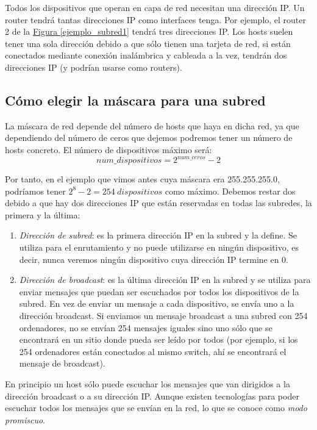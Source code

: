 \documentclass[10pt,a4paper,spanish]{report}
\begin{document}
Todos los dispositivos que operan en capa de red necesitan una dirección IP. Un router tendrá tantas direcciones IP como interfaces tenga. Por ejemplo, el router 2 de la \hyperref[ejemplo_subred1]{Figura \ref*{ejemplo_subred1}} tendrá tres direcciones IP. Los hosts suelen tener una sola dirección debido a que sólo tienen una tarjeta de red, si están conectados mediante conexión inalámbrica y cableada a la vez, tendrán dos direcciones IP (y podrían usarse como routers).

\subsection{\textcolor{tema4}Cómo elegir la máscara para una subred}
La máscara de red depende del número de hosts que haya en dicha red, ya que dependiendo del número de ceros que dejemos podremos tener un número de hosts concreto. El número de dispositivos máximo será:
\begin{displaymath}
  num\_dispositivos = 2^{num\_ceros} - 2
\end{displaymath}

Por tanto, en el ejemplo que vimos antes cuya máscara era 255.255.255.0, podríamos tener $2^8 - 2 = 254 ~ dispositivos$ como máximo. Debemos restar dos debido a que hay dos direcciones IP que están reservadas en todas las subredes, la primera y la última:
\begin{enumerate}[\color{tema4}{$\spadesuit$}]
  \item \textit{\textcolor{tema4}{Dirección de subred}}: es la primera dirección IP en la subred y la define. Se utiliza para el enrutamiento y no puede utilizarse en ningún dispositivo, es decir, nunca veremos ningún dispositivo cuya dirección IP termine en 0.
  \item \textit{\textcolor{tema4}{Dirección de broadcast}}: es la última dirección IP en la subred y se utiliza para enviar mensajes que puedan ser escuchados por todos los dispositivos de la subred. En vez de enviar un mensaje a cada dispositivo, se envía uno a la dirección broadcast. Si enviamos un mensaje broadcast a una subred con 254 ordenadores, no se envían 254 mensajes iguales sino uno sólo que se encontrará en un sitio donde pueda ser leído por todos (por ejemplo, si los 254 ordenadores están conectados al mismo switch, ahí se encontrará el mensaje de broadcast).
\end{enumerate}

En principio un host sólo puede escuchar los mensajes que van dirigidos a la dirección broadcast o a su dirección IP. Aunque existen tecnologías para poder escuchar todos los mensajes que se envían en la red, lo que se conoce como \textit{\textcolor{tema4}{modo promiscuo}}.
\end{document}
